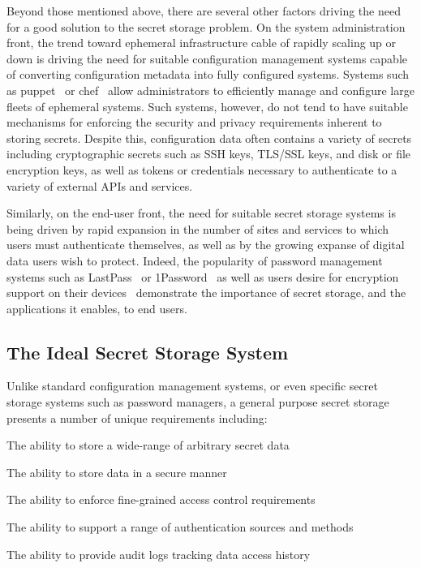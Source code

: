 Beyond those mentioned above, there are several other factors driving
the need for a good solution to the secret storage problem. On the
system administration front, the trend toward ephemeral infrastructure
cable of rapidly scaling up or down is driving the need for suitable
configuration management systems capable of converting configuration
metadata into fully configured systems. Systems such as
puppet~\cite{puppet} or chef~\cite{chef} allow administrators to
efficiently manage and configure large fleets of ephemeral
systems. Such systems, however, do not tend to have suitable
mechanisms for enforcing the security and privacy requirements
inherent to storing secrets. Despite this, configuration data often 
contains a variety of secrets including cryptographic secrets such as 
SSH keys, TLS/SSL keys, and disk or file encryption keys, as well as 
tokens or credentials necessary to authenticate to a variety of 
external APIs and services.

Similarly, on the end-user front, the need for suitable secret storage
systems is being driven by rapid expansion in the number of sites
and services to which users must authenticate themselves, as well as by
the growing expanse of digital data users wish to protect. Indeed, the
popularity of password management systems such as
LastPass~\cite{lastpass} or 1Password~\cite{onepassword} as well as
users desire for encryption support on their
devices~\cite{intercept-cookencryption} demonstrate the importance of
secret storage, and the applications it enables, to end users.

\subsection{The Ideal Secret Storage System}

Unlike standard configuration management systems, or even specific
secret storage systems such as password managers, a general purpose
secret storage presents a number of unique requirements including:

\begin{packed_item}
\item The ability to store a wide-range of arbitrary secret data
\item The ability to store data in a secure manner
\item The ability to enforce fine-grained access control requirements
\item The ability to support a range of authentication sources and methods
\item The ability to provide audit logs tracking data access history
\end{packed_item}

